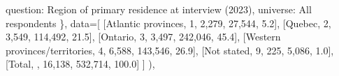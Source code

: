 \documentclass[
  11pt,
  a4paper,
]{article}
\newenvironment{Shaded}{\begin{snugshade}}{\end{snugshade}}
\newcommand{\NormalTok}[1]{\textcolor[rgb]{0.00,0.23,0.31}{#1}}
\newcommand{\OperatorTok}[1]{\textcolor[rgb]{0.37,0.37,0.37}{#1}}
\newcommand{\StringTok}[1]{\textcolor[rgb]{0.13,0.47,0.30}{#1}}
\begin{document}
\begin{Shaded}
\begin{Highlighting}[]
                \StringTok{\textquotesingle{}question\textquotesingle{}}\NormalTok{: }\StringTok{\textquotesingle{}Region of primary residence at interview (2023)\textquotesingle{}}\NormalTok{,}
                \StringTok{\textquotesingle{}universe\textquotesingle{}}\NormalTok{: }\StringTok{\textquotesingle{}All respondents\textquotesingle{}}
\NormalTok{                \},}
\NormalTok{                data}\OperatorTok{=}\NormalTok{[}
\NormalTok{                [}\StringTok{\textquotesingle{}Atlantic provinces\textquotesingle{}}\NormalTok{, }\StringTok{\textquotesingle{}1\textquotesingle{}}\NormalTok{, }\StringTok{\textquotesingle{}2,279\textquotesingle{}}\NormalTok{, }\StringTok{\textquotesingle{}27,544\textquotesingle{}}\NormalTok{, }\StringTok{\textquotesingle{}5.2\textquotesingle{}}\NormalTok{],}
\NormalTok{                [}\StringTok{\textquotesingle{}Quebec\textquotesingle{}}\NormalTok{, }\StringTok{\textquotesingle{}2\textquotesingle{}}\NormalTok{, }\StringTok{\textquotesingle{}3,549\textquotesingle{}}\NormalTok{, }\StringTok{\textquotesingle{}114,492\textquotesingle{}}\NormalTok{, }\StringTok{\textquotesingle{}21.5\textquotesingle{}}\NormalTok{],}
\NormalTok{                [}\StringTok{\textquotesingle{}Ontario\textquotesingle{}}\NormalTok{, }\StringTok{\textquotesingle{}3\textquotesingle{}}\NormalTok{, }\StringTok{\textquotesingle{}3,497\textquotesingle{}}\NormalTok{, }\StringTok{\textquotesingle{}242,046\textquotesingle{}}\NormalTok{, }\StringTok{\textquotesingle{}45.4\textquotesingle{}}\NormalTok{],}
\NormalTok{                [}\StringTok{\textquotesingle{}Western provinces/territories\textquotesingle{}}\NormalTok{, }\StringTok{\textquotesingle{}4\textquotesingle{}}\NormalTok{, }\StringTok{\textquotesingle{}6,588\textquotesingle{}}\NormalTok{, }\StringTok{\textquotesingle{}143,546\textquotesingle{}}\NormalTok{, }\StringTok{\textquotesingle{}26.9\textquotesingle{}}\NormalTok{],}
\NormalTok{                [}\StringTok{\textquotesingle{}Not stated\textquotesingle{}}\NormalTok{, }\StringTok{\textquotesingle{}9\textquotesingle{}}\NormalTok{, }\StringTok{\textquotesingle{}225\textquotesingle{}}\NormalTok{, }\StringTok{\textquotesingle{}5,086\textquotesingle{}}\NormalTok{, }\StringTok{\textquotesingle{}1.0\textquotesingle{}}\NormalTok{],}
\NormalTok{                [}\StringTok{\textquotesingle{}Total\textquotesingle{}}\NormalTok{, }\StringTok{\textquotesingle{}\textquotesingle{}}\NormalTok{, }\StringTok{\textquotesingle{}16,138\textquotesingle{}}\NormalTok{, }\StringTok{\textquotesingle{}532,714\textquotesingle{}}\NormalTok{, }\StringTok{\textquotesingle{}100.0\textquotesingle{}}\NormalTok{]}
\NormalTok{                ]}
\NormalTok{            ),}
        

\end{Highlighting}
\end{Shaded}
\end{document}
